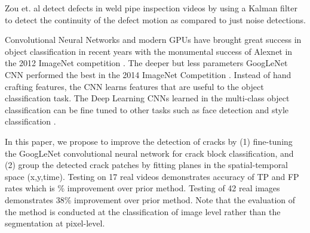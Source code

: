     Zou et. al detect defects in weld pipe inspection videos by using a Kalman filter to detect the continuity of the defect motion as compared to just noise detections.   \cite{Zou2015}

    Convolutional Neural Networks and modern GPUs have brought great success in object classification in recent years with the monumental success of Alexnet in the 2012 ImageNet competition \cite{krizhevsky2012}.  The deeper but less parameters GoogLeNet CNN performed the best in the 2014 ImageNet Competition \cite{szegedy2014}. Instead of hand crafting features, the CNN learns features that are useful to the object classification task. The Deep Learning CNNs learned in the multi-class object classification can be fine tuned to other tasks such as face detection \cite{farfade2015} and style classification \cite{karayev2013}.

    In this paper, we propose to improve the detection of cracks by (1) fine-tuning the GoogLeNet convolutional neural network for crack block classification, and (2) group the detected crack patches by fitting planes in the spatial-temporal space (x,y,time). Testing on 17 real videos demonstrates accuracy of \comment{[XX]} TP and \comment{[XX]} FP rates which is \comment{[XX]}\% improvement over prior method. Testing of 42 real images demonstrates 38\% improvement over prior method. Note that the evaluation of the method is conducted at the classification of image level rather than the segmentation at pixel-level.




